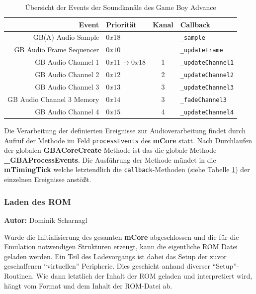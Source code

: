 \documentclass[11pt,a4paper]{scrartcl}
\newcommand{\AutorDominik} {
    \vspace{-4mm}
    \large \textbf{Autor:} Dominik Scharnagl \normalsize
    \vspace{2mm}
}
\begin{document}
\begin{table}[h]
    \centering
    \begin{tabular}{ r | p{3cm} | c | p{7cm} }
        \textbf{Event} & \textbf{Priorit\"at} & \textbf{Kanal} & \textbf{Callback} \\
        \hline
        GB(A) Audio Sample & $0x18$ & & \verb|_sample| \\
        \hline
        GB  Audio Frame Sequencer & $0x10$ & & \verb|_updateFrame| \\
        \hline
        GB Audio Channel 1 & $0x11 \rightarrow 0x18$ & 1 & \verb|_updateChannel1|  \\
        \hline
        GB Audio Channel 2 & $0x12$ & 2 & \verb|_updateChannel2| \\
        \hline
        GB Audio Channel 3 & $0x13$ & 3 & \verb|_updateChannel3| \\
        \hline
        GB Audio Channel 3 Memory & $0x14$ & 3 & \verb|_fadeChannel3| \\
        \hline
        GB Audio Channel 4 & $0x15$ & 4 & \verb|_updateChannel4| \\
    \end{tabular}
    \caption{\"Ubersicht der Events der Soundkan\"ale des Game Boy Advance}
    \label{table:SoundEvents}
\end{table}

Die Verarbeitung der definierten Ereignisse zur Audioverarbeitung findet durch Aufruf der Methode im Feld \verb|processEvents| des \textbf{mCore} statt. Nach Durchlaufen der globalen \textbf{GBACoreCreate}-Methode ist das die globale Methode \textbf{{\_}GBAProcessEvents}. Die Ausf\"uhrung der Methode m\"undet in die \textbf{mTimingTick} welche letztendlich die \verb|callback|-Methoden (siehe Tabelle \ref{table:SoundEvents}) der einzelnen Ereignisse anst\"o{\ss}t.


\newpage
\subsubsection{Laden des ROM}
\AutorDominik

Wurde die Initialisierung des gesamten \textbf{mCore} abgeschlossen und die f\"ur die Emulation notwendigen Strukturen erzeugt, kann die eigentliche ROM Datei geladen werden. Ein Teil des Ladevorgangs ist dabei das Setup der zuvor geschaffenen \enquote{virtuellen} Peripherie. Dies geschieht anhand diverser \enquote{Setup}-Routinen. Wie dann letztlich der Inhalt der ROM geladen und interpretiert wird, h\"angt vom Format und dem Inhalt der ROM-Datei ab.
\end{document}
